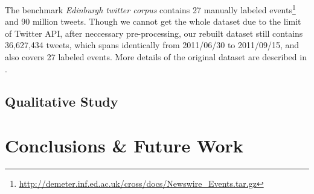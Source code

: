 \documentclass[conference,compsoc]{IEEEtran}
\begin{document}
The benchmark \textit{Edinburgh twitter corpus} contains 27 manually labeled events\cite{petrovic2013can}\footnote{\url{http://demeter.inf.ed.ac.uk/cross/docs/Newswire_Events.tar.gz}} and 90 million tweets. Though we cannot get the whole dataset due to the limit of Twitter API, after neccessary pre-processing, our rebuilt dataset still contains 36,627,434 tweets, which spans identically from 2011/06/30 to 2011/09/15, and also covers 27 labeled events.
More details of the original dataset are described in \cite{petrovic2010edinburgh}.

\subsection{Qualitative Study}

\section{Conclusions \& Future Work}



  
\end{document}
